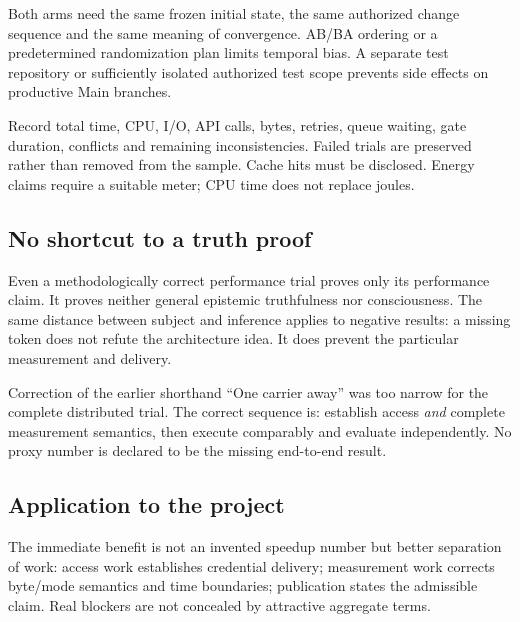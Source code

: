 \begin{cols}
Both arms need the same frozen initial state, the same authorized change sequence and the same meaning of convergence. AB/BA ordering or a predetermined randomization plan limits temporal bias. A separate test repository or sufficiently isolated authorized test scope prevents side effects on productive Main branches.

Record total time, CPU, I/O, API calls, bytes, retries, queue waiting, gate duration, conflicts and remaining inconsistencies. Failed trials are preserved rather than removed from the sample. Cache hits must be disclosed. Energy claims require a suitable meter; CPU time does not replace joules.

\subsection*{No shortcut to a truth proof}
Even a methodologically correct performance trial proves only its performance claim. It proves neither general epistemic truthfulness nor consciousness. The same distance between subject and inference applies to negative results: a missing token does not refute the architecture idea. It does prevent the particular measurement and delivery.

\begin{boundary}{Correction of the earlier shorthand}
``One carrier away'' was too narrow for the complete distributed trial. The correct sequence is: establish access \emph{and} complete measurement semantics, then execute comparably and evaluate independently. No proxy number is declared to be the missing end-to-end result.
\end{boundary}

\subsection*{Application to the project}
The immediate benefit is not an invented speedup number but better separation of work: access work establishes credential delivery; measurement work corrects byte/mode semantics and time boundaries; publication states the admissible claim. Real blockers are not concealed by attractive aggregate terms.
\end{cols}
